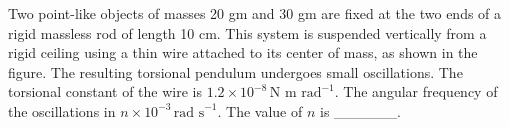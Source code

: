 \item Two point-like objects of masses 20 gm and 30 gm are fixed at the two ends of a rigid massless rod of length 10 cm. This system is suspended vertically from a rigid ceiling using a thin wire attached to its center of mass, as shown in the figure. The resulting torsional pendulum undergoes small oscillations. The torsional constant of the wire is \(1.2 \times 10^{-8} \, \text{N m rad}^{-1}\). The angular frequency of the oscillations in \(n \times 10^{-3} \, \text{rad s}^{-1}\). The value of \(n\) is \_\_\_\_\_\_. 
    \begin{center}
    \end{center}